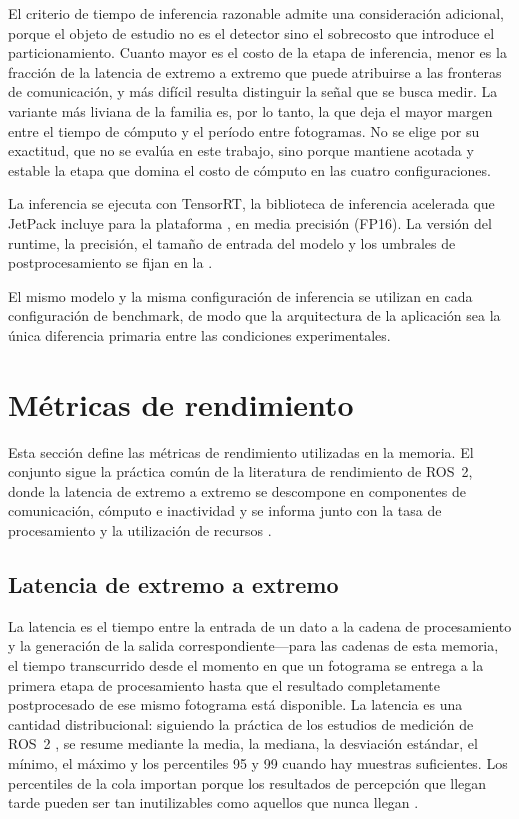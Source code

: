 El criterio de tiempo de inferencia razonable admite una consideración
adicional, porque el objeto de estudio no es el detector sino el sobrecosto
que introduce el particionamiento. Cuanto mayor es el costo de la etapa de
inferencia, menor es la fracción de la latencia de extremo a extremo que
puede atribuirse a las fronteras de comunicación, y más difícil resulta
distinguir la señal que se busca medir. La variante más liviana de la familia
es, por lo tanto, la que deja el mayor margen entre el tiempo de cómputo y
el período entre fotogramas. No se elige por su exactitud, que no se evalúa
en este trabajo, sino porque mantiene acotada y estable la etapa que domina
el costo de cómputo en las cuatro configuraciones.

La inferencia se ejecuta con TensorRT, la biblioteca de inferencia acelerada
que JetPack incluye para la plataforma \cite{nvidiacorporation2026jetpack,
szegedi2026}, en media precisión (FP16). La versión del runtime, la
precisión, el tamaño de entrada del modelo y los umbrales de
postprocesamiento se fijan en la .

El mismo modelo y la misma configuración de inferencia se utilizan en cada
configuración de benchmark, de modo que la arquitectura de la aplicación sea
la única diferencia primaria entre las condiciones experimentales.

\section{Métricas de rendimiento}
\label{sec:metrics}

Esta sección define las métricas de rendimiento utilizadas en la memoria. El
conjunto sigue la práctica común de la literatura de rendimiento de ROS~2,
donde la latencia de extremo a extremo se descompone en componentes de
comunicación, cómputo e inactividad \cite{betz2023a} y se informa junto con
la tasa de procesamiento y la utilización de recursos
\cite{mayoral-vilches2024, macenski2022}.

\subsection{Latencia de extremo a extremo}

La latencia es el tiempo entre la entrada de un dato a la cadena de
procesamiento y la generación de la salida correspondiente---para las
cadenas de esta memoria, el tiempo transcurrido desde el momento en que un
fotograma se entrega a la primera etapa de procesamiento hasta que el
resultado completamente postprocesado de ese mismo fotograma está
disponible. La latencia es una cantidad distribucional: siguiendo la
práctica de los estudios de medición de ROS~2 \cite{kronauer2021,
macenski2022}, se resume mediante la media, la mediana, la desviación
estándar, el mínimo, el máximo y los percentiles 95 y 99 cuando hay muestras
suficientes. Los percentiles de la cola importan porque los resultados de
percepción que llegan tarde pueden ser tan inutilizables como aquellos que
nunca llegan \cite{betz2023a}.

